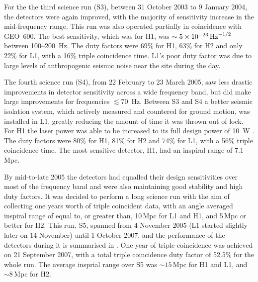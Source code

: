 \documentclass{article}
\begin{document}
For the the third science run (S3), between 31 October 2003 to 9 January 2004,
the detectors were again improved, with the majority of sensitivity increase in
the mid-frequency range. This run was also operated partially in coincidence
with GEO~600. The best sensitivity, which was for H1, was
$\sim5\times10^{-23}\,{\rm Hz}^{-1/2}$ between 100--200~Hz. The duty factors
were 69\% for H1, 63\% for H2 and only 22\% for L1, with a 16\% triple
coincidence time. L1's poor duty factor was due to large levels of anthropogenic
seismic noise near the site during the day.

The fourth science run (S4), from 22 February to 23 March 2005, saw less drastic
improvements in detector sensitivity across a wide frequency band, but did make
large improvements for frequencies $\lesssim 70$~Hz. Between S3 and S4 a better
seismic isolation system, which actively measured and countered for ground
motion, was installed in L1, greatly reducing the amount of time it was thrown
out of lock. For H1 the laser power was able to be increased to its full design
power of 10~W \cite{Abbott:2007b}. The duty factors were 80\% for H1, 81\% for
H2 and 74\% for L1, with a 56\% triple coincidence time. The most sensitive
detector, H1, had an inspiral range of 7.1\,Mpc.

By mid-to-late 2005 the detectors had equalled their design sensitivities over
most of the frequency band and were also maintaining good stability and high
duty factors. It was decided to perform a long science run with the aim of
collecting one years worth of triple coincident data, with an angle averaged
inspiral range of equal to, or greater than, 10\,Mpc for L1 and H1, and 5\,Mpc
or better for H2. This run, S5, spanned from 4 November 2005 (L1 started
slightly later on 14 November) until 1 October 2007, and the performance of the
detectors during it is summarised in \cite{LIGOS5}. One year of triple
coincidence was achieved on 21 September 2007, with a total triple coincidence
duty factor of 52.5\% for the whole run. The average insprial range over S5
was $\sim15$\,Mpc for H1 and L1, and $\sim8$\,Mpc for H2.
\end{document}
